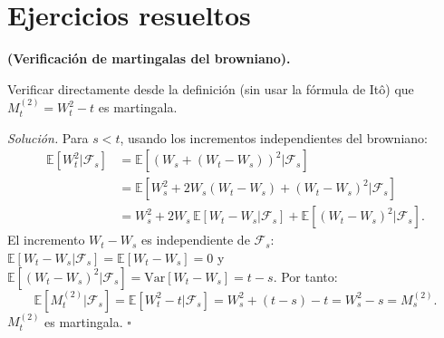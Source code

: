 \section*{Ejercicios resueltos}

\begin{ejercicio}
\label{ej:martingalas}
\textbf{(Verificación de martingalas del browniano).}

Verificar directamente desde la definición (sin usar la fórmula de Itô) que
$M_t^{(2)} = W_t^2 - t$ es martingala.

\medskip\noindent\textit{Solución.}
Para $s < t$, usando los incrementos independientes del browniano:
\begin{align*}
  \mathbb{E}[W_t^2|\mathcal{F}_s]
  &= \mathbb{E}[(W_s + (W_t-W_s))^2|\mathcal{F}_s] \\
  &= \mathbb{E}[W_s^2 + 2W_s(W_t-W_s) + (W_t-W_s)^2|\mathcal{F}_s] \\
  &= W_s^2 + 2W_s\,\mathbb{E}[W_t-W_s|\mathcal{F}_s]
    + \mathbb{E}[(W_t-W_s)^2|\mathcal{F}_s].
\end{align*}
El incremento $W_t-W_s$ es independiente de $\mathcal{F}_s$:
$\mathbb{E}[W_t-W_s|\mathcal{F}_s] = \mathbb{E}[W_t-W_s] = 0$ y
$\mathbb{E}[(W_t-W_s)^2|\mathcal{F}_s] = \mathrm{Var}[W_t-W_s] = t-s$.
Por tanto:
\[
  \mathbb{E}[M_t^{(2)}|\mathcal{F}_s]
  = \mathbb{E}[W_t^2-t|\mathcal{F}_s]
  = W_s^2 + (t-s) - t = W_s^2 - s = M_s^{(2)}.
\]
$M_t^{(2)}$ es martingala. $\square$
\end{ejercicio}

